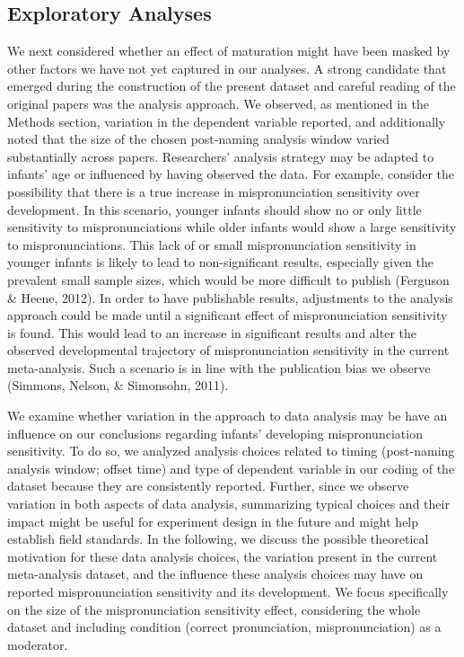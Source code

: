 \documentclass[man]{apa6}
\begin{document}
\hypertarget{exploratory-analyses}{%
\subsection{Exploratory Analyses}\label{exploratory-analyses}}

We next considered whether an effect of maturation might have been masked by other factors we have not yet captured in our analyses. A strong candidate that emerged during the construction of the present dataset and careful reading of the original papers was the analysis approach. We observed, as mentioned in the Methods section, variation in the dependent variable reported, and additionally noted that the size of the chosen post-naming analysis window varied substantially across papers. Researchers' analysis strategy may be adapted to infants' age or influenced by having observed the data. For example, consider the possibility that there is a true increase in mispronunciation sensitivity over development. In this scenario, younger infants should show no or only little sensitivity to mispronunciations while older infants would show a large sensitivity to mispronunciations. This lack of or small mispronunciation sensitivity in younger infants is likely to lead to non-significant results, especially given the prevalent small sample sizes, which would be more difficult to publish (Ferguson \& Heene, 2012). In order to have publishable results, adjustments to the analysis approach could be made until a significant effect of mispronunciation sensitivity is found. This would lead to an increase in significant results and alter the observed developmental trajectory of mispronunciation sensitivity in the current meta-analysis. Such a scenario is in line with the publication bias we observe (Simmons, Nelson, \& Simonsohn, 2011).

We examine whether variation in the approach to data analysis may be have an influence on our conclusions regarding infants' developing mispronunciation sensitivity. To do so, we analyzed analysis choices related to timing (post-naming analysis window; offset time) and type of dependent variable in our coding of the dataset because they are consistently reported. Further, since we observe variation in both aspects of data analysis, summarizing typical choices and their impact might be useful for experiment design in the future and might help establish field standards. In the following, we discuss the possible theoretical motivation for these data analysis choices, the variation present in the current meta-analysis dataset, and the influence these analysis choices may have on reported mispronunciation sensitivity and its development. We focus specifically on the size of the mispronunciation sensitivity effect, considering the whole dataset and including condition (correct pronunciation, mispronunciation) as a moderator.
\end{document}

